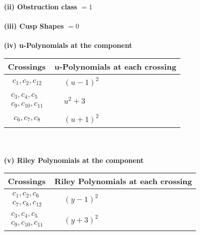 \documentclass[1p]{elsarticle_modified}
\theoremstyle{definition}
\begin{document}
\flushleft \textbf{(ii) Obstruction class $= 1$}\\~\\
\flushleft \textbf{(iii) Cusp Shapes $= 0$}\\~\\
\newpage\renewcommand{\arraystretch}{1}
\flushleft \textbf{(iv) u-Polynomials at the component}\newline \\
\begin{tabular}{m{50pt}|m{274pt}}
Crossings & \hspace{64pt}u-Polynomials at each crossing \\
\hline $$\begin{aligned}c_{1},c_{2},c_{12}\end{aligned}$$&$\begin{aligned}
&(u-1)^2
\end{aligned}$\\
\hline $$\begin{aligned}c_{3},c_{4},c_{5}\\c_{9},c_{10},c_{11}\end{aligned}$$&$\begin{aligned}
&u^2+3
\end{aligned}$\\
\hline $$\begin{aligned}c_{6},c_{7},c_{8}\end{aligned}$$&$\begin{aligned}
&(u+1)^2
\end{aligned}$\\
\hline
\end{tabular}\\~\\
\newpage\renewcommand{\arraystretch}{1}
\flushleft \textbf{(v) Riley Polynomials at the component}\newline \\
\begin{tabular}{m{50pt}|m{274pt}}
Crossings & \hspace{64pt}Riley Polynomials at each crossing \\
\hline $$\begin{aligned}c_{1},c_{2},c_{6}\\c_{7},c_{8},c_{12}\end{aligned}$$&$\begin{aligned}
&(y-1)^2
\end{aligned}$\\
\hline $$\begin{aligned}c_{3},c_{4},c_{5}\\c_{9},c_{10},c_{11}\end{aligned}$$&$\begin{aligned}
&(y+3)^2
\end{aligned}$\\
\hline
\end{tabular}\\~\\
\end{document}
